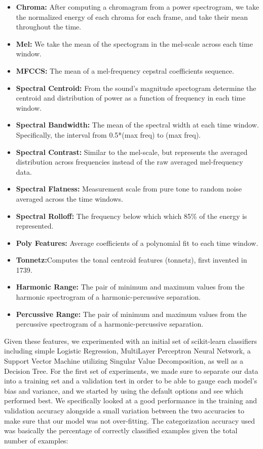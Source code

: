 \documentclass[11pt]{article}
\begin{document}
\begin{itemize}

    \item \textbf{Chroma:} After computing a chromagram from a power spectrogram, we take the normalized energy of each chroma for each frame, and take their mean throughout the time. 
    \item \textbf{Mel:} We take the mean of the spectogram in the mel-scale across each time window.
    \item \textbf{MFCCS:} The mean of a mel-frequency cepstral coefficients sequence.  
    \item \textbf{Spectral Centroid:} From the sound's magnitude spectogram determine the centroid and distribution of power as a function of frequency in each time window.
    \item \textbf{Spectral Bandwidth:} The mean of the spectral width at each time window. Specifically, the interval from 0.5*(max freq) to  (max freq).
    \item \textbf{Spectral Contrast:} Similar to the mel-scale, but represents the averaged distribution across frequencies instead of the raw averaged mel-frequency data.
    \item \textbf{Spectral Flatness:} Measurement scale from pure tone to random noise averaged across the time windows.
    \item \textbf{Spectral Rolloff:} The frequency below which which 85\% of the energy is represented.
    \item \textbf{Poly Features:} Average coefficients of a polynomial fit to each time window.
    \item \textbf{Tonnetz:}Computes the tonal centroid features (tonnetz), first invented in 1739.
    \item \textbf{Harmonic Range:} The pair of minimum and maximum values from the harmonic spectrogram of a harmonic-percussive separation.
    \item \textbf{Percussive Range:} The pair of minimum and maximum values from the percussive spectrogram of a harmonic-percussive separation.
\end{itemize}


Given these features, we experimented with an initial set of scikit-learn classifiers including simple Logistic Regression, MultiLayer Perceptron Neural Network, a Support Vector Machine utilizing Singular Value Decomposition, as well as a Decision Tree. For the first set of experiments, we made sure to separate our data into a training set and a validation test in order to be able to gauge each model's bias and variance, and we started by using the default options and see which performed best. We specifically looked at a good performance in the training and validation accuracy alongside a small variation between the two accuracies to make sure that our model was not over-fitting. The categorization accuracy used was basically the percentage of correctly classified examples given the total number of examples:
\end{document}
